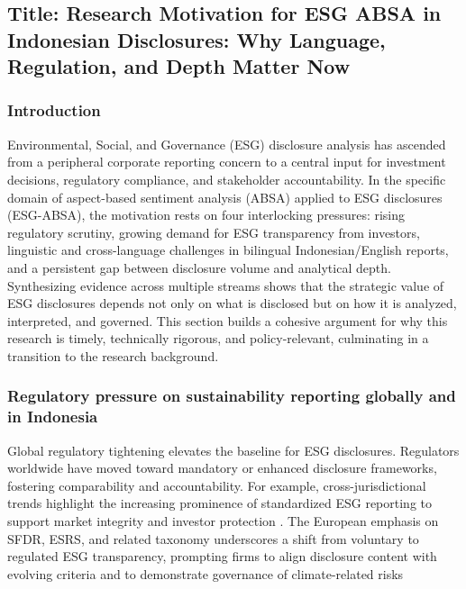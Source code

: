 \subsection{Title: Research Motivation for ESG ABSA in Indonesian Disclosures: Why Language, Regulation, and Depth Matter Now}

\subsubsection{Introduction}
Environmental, Social, and Governance (ESG) disclosure analysis has ascended from a peripheral corporate reporting concern to a central input for investment decisions, regulatory compliance, and stakeholder accountability. In the specific domain of aspect-based sentiment analysis (ABSA) applied to ESG disclosures (ESG-ABSA), the motivation rests on four interlocking pressures: rising regulatory scrutiny, growing demand for ESG transparency from investors, linguistic and cross-language challenges in bilingual Indonesian/English reports, and a persistent gap between disclosure volume and analytical depth. Synthesizing evidence across multiple streams shows that the strategic value of ESG disclosures depends not only on what is disclosed but on how it is analyzed, interpreted, and governed. This section builds a cohesive argument for why this research is timely, technically rigorous, and policy-relevant, culminating in a transition to the research background.

\subsubsection{Regulatory pressure on sustainability reporting globally and in Indonesia}
Global regulatory tightening elevates the baseline for ESG disclosures. Regulators worldwide have moved toward mandatory or enhanced disclosure frameworks, fostering comparability and accountability. For example, cross-jurisdictional trends highlight the increasing prominence of standardized ESG reporting to support market integrity and investor protection 
\cite{10.22617/tcs210472-2,10.2139/ssrn.4359928,10.1108/mf-01-2023-0020,10.1007/s40804-021-00233-z}. The European emphasis on SFDR, ESRS, and related taxonomy underscores a shift from voluntary to regulated ESG transparency, prompting firms to align disclosure content with evolving criteria and to demonstrate governance of climate-related risks \cite{10.3390/su152416860,10.1108/ara-07-2023-0201,10.22617/tcs210472-2}

